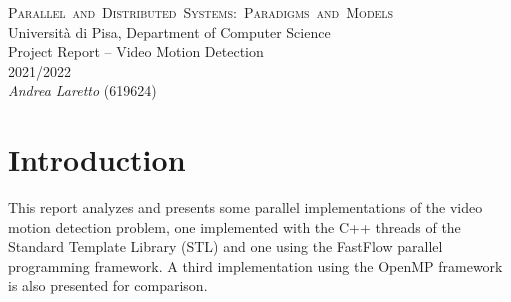 \documentclass{article}
\begin{document}
\begin{center}
	\textsc{\large{Parallel~and~Distributed~Systems:~Paradigms~and~Models\\}}
	\textnormal{ \large{Università di Pisa, Department of Computer Science\\}}
	\vspace{3mm}
	\textnormal{ \Large{Project Report -- Video Motion Detection\\}}
	\vspace{1mm}
	\textnormal{ \large{2021/2022\\}}
	\vspace{3mm}
	\textnormal{ \Large{\textit{Andrea Laretto}} \Large{(619624)\\}}
\end{center}

\setlength{\parindent}{0em}

\section{Introduction}
This report analyzes and presents some parallel implementations of the video motion detection problem, one implemented with the \textsf{C++} threads of the Standard Template Library (STL) and one using the \textsf{FastFlow} parallel programming framework. A third implementation using the \textsf{OpenMP} framework is also presented for comparison.



\end{document}
